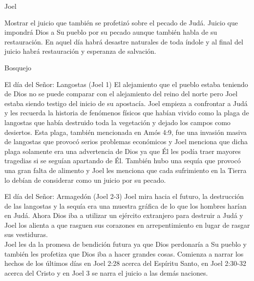 \begin{section}{Joel}
\begin{enumerate}
			Mostrar el juicio que también se profetizó sobre el pecado de Judá. Juicio que impondrá Dios a Su pueblo por su pecado aunque también habla de su restauración. En aquel día habrá desastre naturales de toda índole y al final del juicio habrá restauración y esperanza de salvación.
	\end{enumerate}
	\begin{subsection}{Bosquejo}
		\begin{subsubsection}{El día del Señor: Langostas (Joel 1)}
El alejamiento que el pueblo estaba teniendo de Dios no se puede comparar con el alejamiento del reino del norte pero Joel estaba siendo testigo del inicio de su apostacía. Joel empieza a confrontar a Judá y les recuerda la historia de fenómenos físicos que habían vivido como la plaga de langostas que había destruido toda la vegetación y dejado los campos como desiertos.
\newpage
Esta plaga, también mencionada en Amós 4:9, fue una invasión masiva de langostas que provocó serios problemas económicos y Joel menciona que dicha plaga solamente era una advertencia de Dios ya que Él les podía traer mayores tragedias si se seguían apartando de Él. También hubo una sequía que provocó una gran falta de alimento y Joel les menciona que cada sufrimiento en la Tierra lo debían de considerar como un juicio por su pecado.
		\end{subsubsection}
		\begin{subsubsection}{El día del Señor: Armagedón (Joel 2-3)}
			Joel mira hacia el futuro, la destrucción de las langostas y la sequía era una muestra gráfica de lo que los hombres harían en Judá. Ahora Dios iba a utilizar un ejército extranjero para destruir a Judá y Joel los alienta a que rasguen sus corazones en arrepentimiento en lugar de rasgar sus vestiduras. \\
			Joel les da la promesa de bendición futura ya que Dios perdonaría a Su pueblo y también les profetiza que Dios iba a hacer grandes cosas. Comienza a narrar los hechos de los últimos días en Joel 2:28 acerca del Espíritu Santo, en Joel 2:30-32 acerca del Cristo y en Joel 3 se narra el juicio a las demás naciones.\\
		\end{subsubsection}
	\end{subsection}
\end{section}
%


